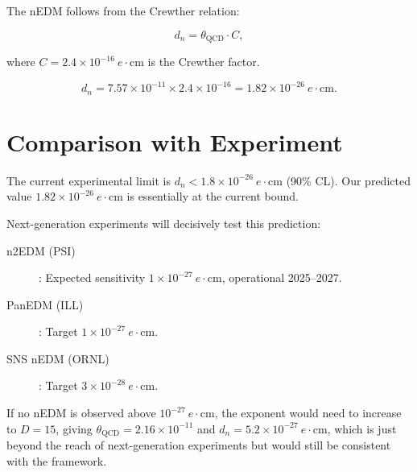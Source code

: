 The nEDM follows from the Crewther relation:

\[
d_n = \theta_{\text{QCD}} \cdot C,
\]

where \(C = 2.4 \times 10^{-16}\ e\cdot\text{cm}\) is the Crewther factor.

\[
d_n = 7.57 \times 10^{-11} \times 2.4 \times 10^{-16}
     = 1.82 \times 10^{-26}\ e\cdot\text{cm}.
\]

\section{Comparison with Experiment}

The current experimental limit is \(d_n < 1.8 \times 10^{-26}\ e\cdot\text{cm}\)
(90\% CL).  Our predicted value \(1.82 \times 10^{-26}\ e\cdot\text{cm}\)
is essentially at the current bound.

Next-generation experiments will decisively test this prediction:
\begin{description}
\item[n2EDM (PSI)]: Expected sensitivity \(1 \times 10^{-27}\ e\cdot\text{cm}\),
operational 2025--2027.
\item[PanEDM (ILL)]: Target \(1 \times 10^{-27}\ e\cdot\text{cm}\).
\item[SNS nEDM (ORNL)]: Target \(3 \times 10^{-28}\ e\cdot\text{cm}\).
\end{description}

If no nEDM is observed above \(10^{-27}\ e\cdot\text{cm}\), the exponent
would need to increase to \(D = 15\), giving
\(\theta_{\text{QCD}} = 2.16 \times 10^{-11}\) and
\(d_n = 5.2 \times 10^{-27}\ e\cdot\text{cm}\), which is just beyond
the reach of next-generation experiments but would still be consistent
with the framework.
